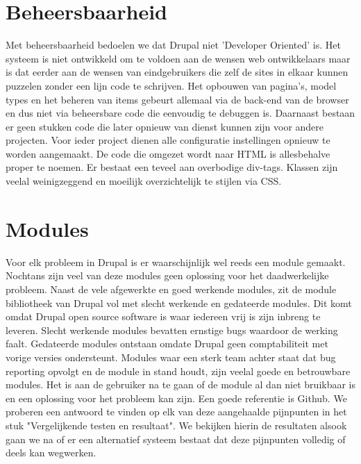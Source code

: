 \section{Beheersbaarheid}
Met beheersbaarheid bedoelen we dat Drupal niet 'Developer Oriented' is. Het systeem is niet ontwikkeld om te voldoen aan de wensen web ontwikkelaars maar is dat eerder aan de wensen van eindgebruikers die zelf de sites in elkaar kunnen puzzelen zonder een lijn code te schrijven. Het opbouwen van pagina's, model types en het beheren van items gebeurt allemaal via de back-end van de browser en dus niet via beheersbare code die eenvoudig te debuggen is. Daarnaast bestaan er geen stukken code die later opnieuw van dienst kunnen zijn voor andere projecten. Voor ieder project dienen alle configuratie instellingen opnieuw te worden aangemaakt.
\newline\newline
De code die omgezet wordt naar HTML is allesbehalve proper te noemen. Er bestaat een teveel aan overbodige div-tags. Klassen zijn veelal weinigzeggend en moeilijk overzichtelijk te stijlen via CSS.

\section{Modules}
Voor elk probleem in Drupal is er waarschijnlijk wel reeds een module gemaakt. Nochtans zijn veel van deze modules geen oplossing voor het daadwerkelijke probleem. Naast de vele afgewerkte en goed werkende modules, zit de module bibliotheek van Drupal vol met slecht werkende en gedateerde modules. Dit komt omdat Drupal open source software is waar iedereen vrij is zijn inbreng te leveren. Slecht werkende modules bevatten ernstige bugs waardoor de werking faalt. Gedateerde modules ontstaan omdate Drupal geen comptabiliteit met vorige versies ondersteunt.
\newline\newline
Modules waar een sterk team achter staat dat bug reporting opvolgt en de module in stand houdt, zijn veelal goede en betrouwbare modules. Het is aan de gebruiker na te gaan of de module al dan niet bruikbaar is en een oplossing voor het probleem kan zijn. Een goede referentie is Github.
\newline\newline\newline
We proberen een antwoord te vinden op elk van deze aangehaalde pijnpunten in het stuk "Vergelijkende testen en resultaat". We bekijken hierin de resultaten alsook gaan we na of er een alternatief systeem bestaat dat deze pijnpunten volledig of deels kan wegwerken.
